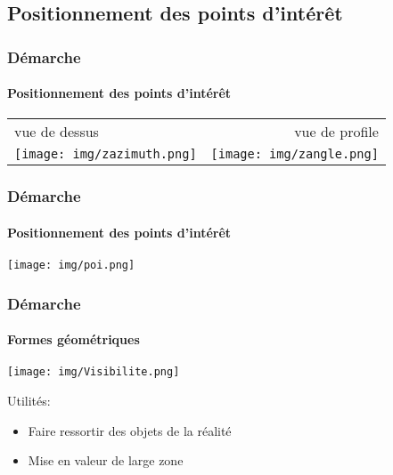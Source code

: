 \subsection{Positionnement des points d'intérêt}

\begin{frame}
\frametitle{Démarche}
\framesubtitle{Positionnement des points d'intérêt}
\begin{center}
\begin{tabular}{l|r}
vue de dessus & vue de profile \\
\texttt{[image: img/zazimuth.png]} & \texttt{[image: img/zangle.png]} \\
\end{tabular}
\end{center}
\end{frame}

\begin{frame}
\frametitle{Démarche}
\framesubtitle{Positionnement des points d'intérêt}
\begin{center}
\texttt{[image: img/poi.png]}
\end{center}
\end{frame}

\begin{frame}
\frametitle{Démarche}
\framesubtitle{Formes géométriques}
\begin{center}\texttt{[image: img/Visibilite.png]}\end{center}
Utilités:\\
\begin{itemize}
	\item Faire ressortir des objets de la réalité
	\item Mise en valeur de large zone
\end{itemize}
\end{frame}

